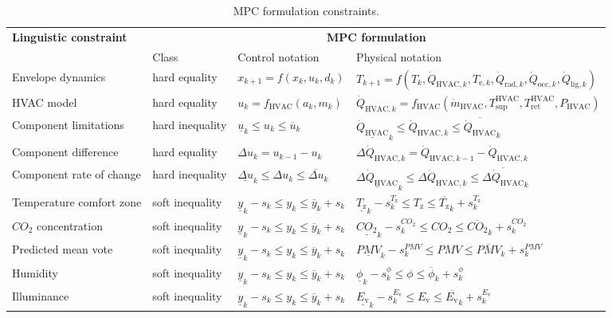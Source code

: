\documentclass[10pt]{article}
\begin{document}
\renewcommand{\arraystretch}{2.5}
\begin{table}[ht]
	\centering
	\caption{MPC formulation constraints.}
	\label{tab:mpc_form:constraints}
	\begin{adjustwidth}{-1cm}{}
	\begin{tabular}{l|lll}
		\toprule
		\textbf{Linguistic constraint}  &  \multicolumn{3}{c}{\textbf{MPC formulation}} \\
		& Class &  Control notation &  Physical notation \\
		\midrule
		Envelope dynamics & hard equality & $ x_{k+1} = f(x_k,u_k,d_k) $  & $ T_{k+1} = f(T_k,\dot{Q}_{\text{HVAC},k},T_{\text{e},k},\dot{Q}_{\text{rad},k},\dot{Q}_{\text{occ},k},\dot{Q}_{\text{lig},k}) $ \\ 
		{\color{blue} HVAC model } & hard equality & $ u_{k} = f_{\text{HVAC}}(a_k,m_k) $  & $ \dot{Q}_{\text{HVAC},k} = f_{\text{HVAC}}(\dot{m}_{\text{HVAC}}, T_{\text{sup}}^{\text{HVAC}},T_{\text{ret}}^{\text{HVAC}},P_{\text{HVAC}}) $ \\ 
		Component limitations & hard inequality & $ \underline{u}_k \le u_k \le \overline{u}_k  $  & $ \underline{\dot{Q}_{\text{HVAC}}}_k  \le \dot{Q}_{\text{HVAC},k}  \le \overline{\dot{Q}_{\text{HVAC}}}_k  $ \\ 
		Component difference & hard equality & $\Delta u_k = u_{k-1} - u_k $  & $\Delta \dot{Q}_{\text{HVAC},k} = \dot{Q}_{\text{HVAC},k-1} - \dot{Q}_{\text{HVAC},k} $  \\ 
		Component rate of change & hard inequality & $ \underline{\Delta u}_k   \le \Delta u_k  \le \overline{\Delta u}_k  $ & $ \underline{\Delta \dot{Q}_{\text{HVAC}}}_k   \le \Delta \dot{Q}_{\text{HVAC},k}  \le \overline{\Delta \dot{Q}_{\text{HVAC}}}_k  $ \\ 
		Temperature comfort zone & soft inequality & $ \underline{y}_k - s_k \le y_k \le \overline{y}_k + s_k $  & $ \underline{T_{\text{z}}}_k - s^{T_{\text{z}}}_{k} \le T_{\text{z}} \le \overline{T_{\text{z}}}_k + s^{T_{\text{z}}}_{k} $ \\
		$CO_2$ concentration & soft inequality & $ \underline{y}_k - s_k \le y_k \le \overline{y}_k + s_k $ & $ \underline{{CO_2}}_k - s^{CO_2}_k \le CO_2 \le \overline{{CO_2}}_k + s^{CO_2}_k $  \\
		Predicted mean vote &  soft inequality & $ \underline{y}_k - s_k \le y_k \le \overline{y}_k + s_k $ & $ \underline{PMV}_k - s^{PMV}_k \le PMV \le \overline{PMV}_k + s^{PMV}_k $  \\
		Humidity & soft inequality & $ \underline{y}_k - s_k \le y_k \le \overline{y}_k + s_k $ & $ \underline{\phi}_k - s^{\phi}_k \le \phi \le \overline{\phi}_k + s^{\phi}_k $  \\
		Illuminance & soft inequality & $ \underline{y}_k - s_k \le y_k \le \overline{y}_k + s_k $ & $ \underline{{E_\text{v}}}_k - s^{E_\text{v}}_k \le E_\text{v} \le \overline{{E_\text{v}}}_k + s^{E_\text{v}}_k $  \\
		\bottomrule 
	\end{tabular}
	\end{adjustwidth}
\end{table}
\end{document}
